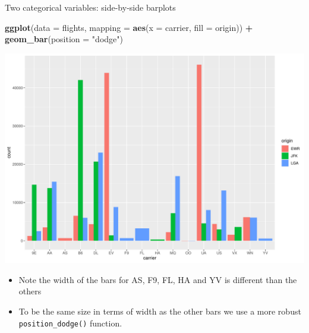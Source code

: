 \documentclass[
  ignorenonframetext,
]{beamer}
\newenvironment{Shaded}{\begin{snugshade}}{\end{snugshade}}
\newcommand{\AttributeTok}[1]{\textcolor[rgb]{0.13,0.29,0.53}{#1}}
\newcommand{\FunctionTok}[1]{\textcolor[rgb]{0.13,0.29,0.53}{\textbf{#1}}}
\newcommand{\NormalTok}[1]{#1}
\newcommand{\SpecialCharTok}[1]{\textcolor[rgb]{0.81,0.36,0.00}{\textbf{#1}}}
\newcommand{\StringTok}[1]{\textcolor[rgb]{0.31,0.60,0.02}{#1}}
\providecommand{\tightlist}{%
  \setlength{\itemsep}{0pt}\setlength{\parskip}{0pt}}
\begin{document}
\begin{frame}[fragile]{Two categorical variables: side-by-side barplots}
\protect\hypertarget{two-categorical-variables-side-by-side-barplots-1}{}
\tiny

\begin{Shaded}
\begin{Highlighting}[]
\FunctionTok{ggplot}\NormalTok{(}\AttributeTok{data =}\NormalTok{ flights, }\AttributeTok{mapping =} \FunctionTok{aes}\NormalTok{(}\AttributeTok{x =}\NormalTok{ carrier, }\AttributeTok{fill =}\NormalTok{ origin)) }\SpecialCharTok{+}
  \FunctionTok{geom\_bar}\NormalTok{(}\AttributeTok{position =} \StringTok{"dodge"}\NormalTok{)}
\end{Highlighting}
\end{Shaded}

\begin{center}\includegraphics[width=0.9\linewidth,height=0.5\textheight]{Week2_Lect_files/figure-beamer/unnamed-chunk-44-1} \end{center}
\normalsize

\begin{itemize}
\tightlist
\item
  Note the width of the bars for AS, F9, FL, HA and YV is different than
  the others
\item
  To be the same size in terms of width as the other bars we use a more
  robust \texttt{position\_dodge()} function.
\end{itemize}
\end{frame}
\end{document}
